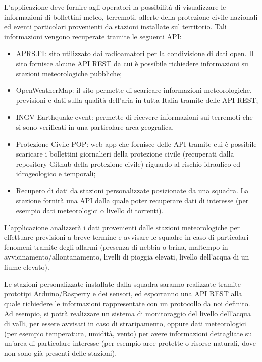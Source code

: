 L'applicazione deve fornire agli operatori la possibilità di visualizzare le informazioni di bollettini meteo, terremoti, allerte della protezione civile nazionali ed eventi particolari provenienti da stazioni installate sul territorio. Tali informazioni vengono recuperate tramite le seguenti API: 
\begin{itemize}
	\item APRS.FI: sito utilizzato dai radioamatori per la condivisione di dati open. Il sito fornisce alcune API REST da cui è possibile richiedere informazioni su stazioni meteorologiche pubbliche;
	\item OpenWeatherMap: il sito permette di scaricare informazioni meteorologiche, previsioni e dati sulla qualità dell’aria in tutta Italia tramite delle API REST;
	\item INGV Earthquake event: permette di ricevere informazioni sui terremoti che si sono verificati in una particolare area geografica.
	\item Protezione Civile POP: web app che fornisce delle API tramite cui è possibile scaricare i bollettini giornalieri della protezione civile (recuperati dalla repository Github della protezione civile) riguardo al rischio idraulico ed idrogeologico e temporali;
	\item Recupero di dati da stazioni personalizzate posizionate da una squadra. La stazione fornirà una API dalla quale poter recuperare dati di interesse (per esempio dati meteorologici o livello di torrenti). 
\end{itemize}

L'applicazione analizzerà i dati provenienti dalle stazioni meteorologiche per effettuare previsioni a breve termine e avvisare le squadre in caso di particolari fenomeni tramite degli allarmi (presenza di nebbia o brina, maltempo in avvicinamento/allontanamento, livelli di pioggia elevati, livello dell'acqua di un fiume elevato).

Le stazioni personalizzate installate dalla squadra saranno realizzate tramite prototipi Arduino/Rasperry e dei sensori, ed esporranno una API REST alla quale richiedere le informazioni rappresentate con un protocollo da noi definito. Ad esempio, si potrà realizzare un sistema di monitoraggio del livello dell’acqua di valli, per essere avvisati in caso di straripamento, oppure dati meteorologici (per esempio temperatura, umidità, vento) per avere informazioni dettagliate su un’area di particolare interesse (per esempio aree protette o risorse naturali, dove non sono già presenti delle stazioni). 

